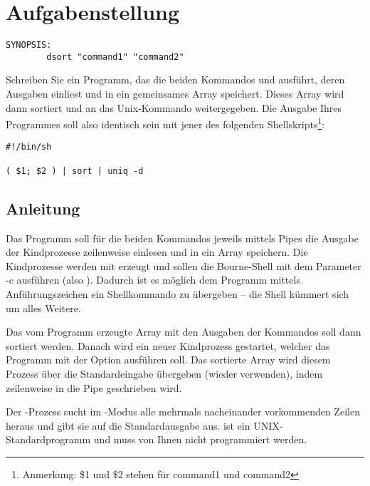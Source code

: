 




\section*{Aufgabenstellung}


\begin{verbatim}
SYNOPSIS:
        dsort "command1" "command2"
\end{verbatim}

Schreiben Sie ein Programm, das die beiden Kommandos 
und  ausführt, deren Ausgaben einliest und in ein
gemeinsames Array speichert. Dieses Array wird dann sortiert und an
das Unix-Kommando  weitergegeben. Die Ausgabe Ihres
Programmes soll also identisch sein mit jener des folgenden
Shellskripts\footnote{Anmerkung: \$1 und \$2 stehen für command1 und
command2}:

\begin{verbatim}
#!/bin/sh

( $1; $2 ) | sort | uniq -d
\end{verbatim}

\subsection*{Anleitung}

Das Programm soll für die beiden Kommandos jeweils mittels Pipes die
Ausgabe der Kindprozesse zeilenweise einlesen und in ein Array
speichern. Die Kindprozesse werden mit  erzeugt und
sollen die Bourne-Shell mit dem Parameter -c ausführen (also
). Dadurch ist es möglich dem Programm mittels
Anführungszeichen ein Shellkommando zu übergeben – die Shell kümmert
sich um alles Weitere.

Das vom Programm erzeugte Array mit den Ausgaben der Kommandos soll
dann sortiert werden. Danach wird ein neuer Kindprozess gestartet,
welcher das Programm  mit der Option  ausführen
soll. Das sortierte Array wird diesem Prozess über die Standardeingabe
übergeben (wieder  verwenden), indem zeilenweise in die
Pipe geschrieben wird.

Der -Prozess sucht im -Modus alle mehrmals
nacheinander vorkommenden Zeilen heraus und gibt sie auf die
Standardausgabe aus.  ist ein UNIX-Standardprogramm und
muss von Ihnen nicht programmiert werden.

